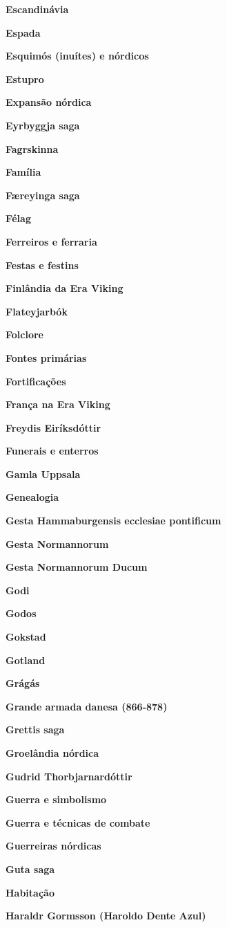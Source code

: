 \textbf{Escandinávia}

\textbf{Espada}

\textbf{Esquimós (inuítes) e nórdicos}

\textbf{Estupro}

\textbf{Expansão nórdica}

\textbf{Eyrbyggja saga}

\textbf{Fagrskinna}

\textbf{Família}

\textbf{Færeyinga saga}

\textbf{Félag}

\textbf{Ferreiros e ferraria}

\textbf{Festas e festins}

\textbf{Finlândia da Era Viking}

\textbf{Flateyjarbók}

\textbf{Folclore}

\textbf{Fontes primárias}

\textbf{Fortificações}

\textbf{França na Era Viking}

\textbf{Freydis Eiríksdóttir}

\textbf{Funerais e enterros}

\textbf{Gamla Uppsala}

\textbf{Genealogia}

\textbf{Gesta Hammaburgensis ecclesiae pontificum}

\textbf{Gesta Normannorum}

\textbf{Gesta Normannorum Ducum}

\textbf{Godi}

\textbf{Godos}

\textbf{Gokstad}

\textbf{Gotland}

\textbf{Grágás}

\textbf{Grande armada danesa (866-878)}

\textbf{Grettis saga}

\textbf{Groelândia nórdica}

\textbf{Gudrid Thorbjarnardóttir}

\textbf{Guerra e simbolismo}

\textbf{Guerra e técnicas de combate}

\textbf{Guerreiras nórdicas}

\textbf{Guta saga}

\textbf{Habitação}

\textbf{Haraldr Gormsson (Haroldo Dente Azul)}

